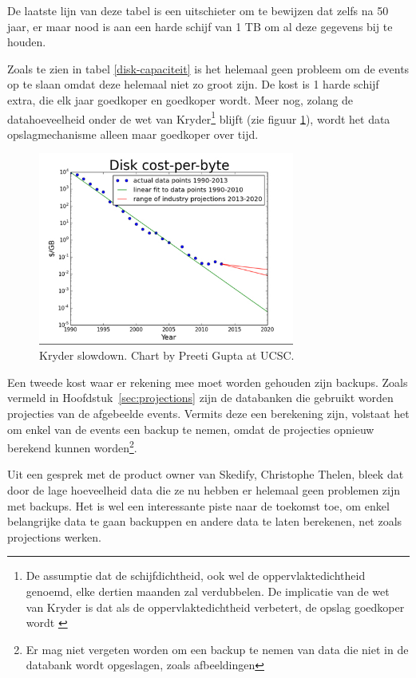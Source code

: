De laatste lijn van deze tabel is een uitschieter om te bewijzen dat zelfs na 50 jaar, er maar nood is aan een harde schijf van 1 TB om al deze gegevens bij te houden.

Zoals te zien in tabel \ref{disk-capaciteit} is het helemaal geen probleem om de events op te slaan omdat deze helemaal niet zo groot zijn. De kost is 1 harde schijf extra, die elk jaar goedkoper en goedkoper wordt. Meer nog, zolang de datahoeveelheid onder de wet van Kryder\footnote{De assumptie dat de schijfdichtheid, ook wel de oppervlaktedichtheid genoemd, elke dertien maanden zal verdubbelen. De implicatie van de wet van Kryder is dat als de oppervlaktedichtheid verbetert, de opslag goedkoper wordt \autocite{walter2005kryder}} blijft (zie figuur \ref{fig:krydersslowdown}), wordt het data opslagmechanisme alleen maar goedkoper over tijd.

\begin{figure}[h]
\caption{Kryder slowdown. Chart by Preeti Gupta at UCSC.} \label{fig:krydersslowdown}
\centering
\includegraphics[width=0.75\textwidth]{img/kryder-slowdown}
\end{figure}

Een tweede kost waar er rekening mee moet worden gehouden zijn backups. Zoals vermeld in Hoofdstuk~\ref{sec:projections} zijn de databanken die gebruikt worden projecties van de afgebeelde events. Vermits deze een berekening zijn, volstaat het om enkel van de events een backup te nemen, omdat de projecties opnieuw berekend kunnen worden\footnote{Er mag niet vergeten worden om een backup te nemen van data die niet in de databank wordt opgeslagen, zoals afbeeldingen}.

Uit een gesprek met de product owner van Skedify, Christophe Thelen, bleek dat door de lage hoeveelheid data die ze nu hebben er helemaal geen problemen zijn met backups. Het is wel een interessante piste naar de toekomst toe, om enkel belangrijke data te gaan backuppen en andere data te laten berekenen, net zoals projections werken.

